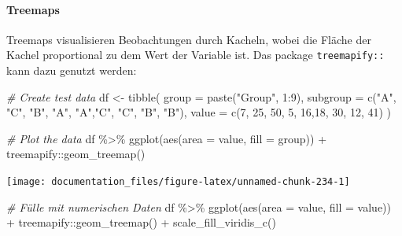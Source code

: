 \documentclass[
]{article}
\newenvironment{Shaded}{\begin{snugshade}}{\end{snugshade}}
\newcommand{\AttributeTok}[1]{\textcolor[rgb]{0.77,0.63,0.00}{#1}}
\newcommand{\CommentTok}[1]{\textcolor[rgb]{0.56,0.35,0.01}{\textit{#1}}}
\newcommand{\DecValTok}[1]{\textcolor[rgb]{0.00,0.00,0.81}{#1}}
\newcommand{\FunctionTok}[1]{\textcolor[rgb]{0.00,0.00,0.00}{#1}}
\newcommand{\NormalTok}[1]{#1}
\newcommand{\OtherTok}[1]{\textcolor[rgb]{0.56,0.35,0.01}{#1}}
\newcommand{\SpecialCharTok}[1]{\textcolor[rgb]{0.00,0.00,0.00}{#1}}
\newcommand{\StringTok}[1]{\textcolor[rgb]{0.31,0.60,0.02}{#1}}
\begin{document}
\hypertarget{treemaps}{%
\paragraph{Treemaps}\label{treemaps}}

Treemaps visualisieren Beobachtungen durch Kacheln, wobei die Fläche der Kachel proportional zu dem Wert der Variable ist. Das package \texttt{treemapify::} kann dazu genutzt werden:

\begin{Shaded}
\begin{Highlighting}[]
\CommentTok{\# Create test data}
\NormalTok{df }\OtherTok{\textless{}{-}} \FunctionTok{tibble}\NormalTok{(}
  \AttributeTok{group =} \FunctionTok{paste}\NormalTok{(}\StringTok{"Group"}\NormalTok{, }\DecValTok{1}\SpecialCharTok{:}\DecValTok{9}\NormalTok{),}
  \AttributeTok{subgroup =} \FunctionTok{c}\NormalTok{(}\StringTok{"A"}\NormalTok{, }\StringTok{"C"}\NormalTok{, }\StringTok{"B"}\NormalTok{, }\StringTok{"A"}\NormalTok{, }\StringTok{"A"}\NormalTok{,}\StringTok{"C"}\NormalTok{, }\StringTok{"C"}\NormalTok{, }\StringTok{"B"}\NormalTok{, }\StringTok{"B"}\NormalTok{),}
  \AttributeTok{value =} \FunctionTok{c}\NormalTok{(}\DecValTok{7}\NormalTok{, }\DecValTok{25}\NormalTok{, }\DecValTok{50}\NormalTok{, }\DecValTok{5}\NormalTok{, }\DecValTok{16}\NormalTok{,}\DecValTok{18}\NormalTok{, }\DecValTok{30}\NormalTok{, }\DecValTok{12}\NormalTok{, }\DecValTok{41}\NormalTok{)}
\NormalTok{)}

\CommentTok{\# Plot the data}
\NormalTok{df }\SpecialCharTok{\%\textgreater{}\%}
  \FunctionTok{ggplot}\NormalTok{(}\FunctionTok{aes}\NormalTok{(}\AttributeTok{area =}\NormalTok{ value, }\AttributeTok{fill =}\NormalTok{ group)) }\SpecialCharTok{+}
\NormalTok{  treemapify}\SpecialCharTok{::}\FunctionTok{geom\_treemap}\NormalTok{()}
\end{Highlighting}
\end{Shaded}

\begin{center}\texttt{[image: documentation\_files/figure-latex/unnamed-chunk-234-1]} \end{center}

\begin{Shaded}
\begin{Highlighting}[]

\CommentTok{\# Fülle mit numerischen Daten}
\NormalTok{df }\SpecialCharTok{\%\textgreater{}\%}
  \FunctionTok{ggplot}\NormalTok{(}\FunctionTok{aes}\NormalTok{(}\AttributeTok{area =}\NormalTok{ value, }\AttributeTok{fill =}\NormalTok{ value)) }\SpecialCharTok{+}
\NormalTok{  treemapify}\SpecialCharTok{::}\FunctionTok{geom\_treemap}\NormalTok{() }\SpecialCharTok{+}
  \FunctionTok{scale\_fill\_viridis\_c}\NormalTok{()}
\end{Highlighting}
\end{Shaded}
\end{document}
